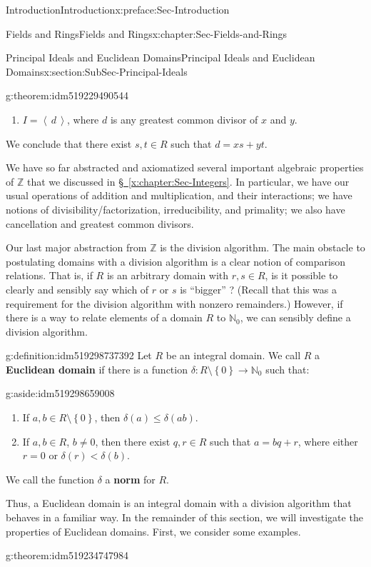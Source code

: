 \documentclass[oneside,10pt,]{book}
\newcommand{\xreffont}{\relax}
\newcommand{\terminology}[1]{\textbf{#1}}
\numberwithin{equation}{section}
\renewcommand{\le}{\leqslant}
\newcommand{\ideal}[1]{\left\langle\, #1 \,\right\rangle}
\newcommand{\set}[1]{\left\{ {#1} \right\}}
\def\Z{{\mathbb Z}}
\def\N{{\mathbb N}}
\newcommand{\lt}{<}
\begin{document}
\begin{preface}{Introduction}{}{Introduction}{}{}{x:preface:Sec-Introduction}
\begin{chapterptx}{Fields and Rings}{}{Fields and Rings}{}{}{x:chapter:Sec-Fields-and-Rings}
\begin{sectionptx}{Principal Ideals and Euclidean Domains}{}{Principal Ideals and Euclidean Domains}{}{}{x:section:SubSec-Principal-Ideals}
\begin{theorem}{}{}{g:theorem:idm519229490544}
\begin{enumerate}
\item{}\(I = \ideal{d}\), where \(d\) is any greatest common divisor of \(x\) and \(y\).%
\end{enumerate}
%
\par
We conclude that there exist \(s,t\in R\) such that \(d = xs + yt\).%
\end{theorem}
We have so far abstracted and axiomatized several important algebraic properties of \(\Z\) that we discussed in \hyperref[x:chapter:Sec-Integers]{§~{\xreffont\ref{x:chapter:Sec-Integers}}}. In particular, we have our usual operations of addition and multiplication, and their interactions; we have notions of divisibility\slash{}factorization, irreducibility, and primality; we also have cancellation and greatest common divisors.%
\par
Our last major abstraction from \(\Z\) is the division algorithm. The main obstacle to postulating domains with a division algorithm is a clear notion of comparison relations. That is, if \(R\) is an arbitrary domain with \(r,s\in R\), is it possible to clearly and sensibly say which of \(r\) or \(s\) is ``bigger'' ? (Recall that this was a requirement for the division algorithm with nonzero remainders.) However, if there is a way to relate elements of a domain \(R\) to \(\N_0\), we can sensibly define a division algorithm.%
\begin{definition}{}{g:definition:idm519298737392}%
Let \(R\) be an integral domain. We call \(R\) a \terminology{Euclidean domain} if there is a function \(\delta : R\setminus \set{0} \to \N_0\) such that: \begin{aside}{}{g:aside:idm519298659008}%
\end{aside}
%
\begin{enumerate}
\item{}If \(a,b\in R\setminus \set{0}\), then \(\delta(a) \le \delta(ab)\).%
\item{}If \(a,b\in R\), \(b\ne 0\), then there exist \(q,r\in R\) such that \(a = bq+r\), where either \(r = 0\) or \(\delta(r) \lt \delta(b)\).%
\end{enumerate}
%
\par
We call the function \(\delta\) a \terminology{norm} for \(R\).%
\end{definition}
Thus, a Euclidean domain is an integral domain with a division algorithm that behaves in a familiar way. In the remainder of this section, we will investigate the properties of Euclidean domains. First, we consider some examples.%
\begin{theorem}{}{}{g:theorem:idm519234747984}%

\end{theorem}
\end{sectionptx}
\end{chapterptx}
\end{preface}
\end{document}
